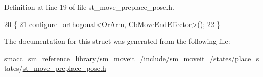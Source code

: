 Definition at line 19 of file st\+\_\+move\+\_\+preplace\+\_\+pose.\+h.


\begin{DoxyCode}
20             \{
21                 configure\_orthogonal<OrArm, CbMoveEndEffector>();
22             \}
\end{DoxyCode}


The documentation for this struct was generated from the following file\+:\begin{DoxyCompactItemize}
\item 
smacc\+\_\+sm\+\_\+reference\+\_\+library/sm\+\_\+moveit\+\_/include/sm\+\_\+moveit\+\_/states/place\+\_\+states/\hyperlink{4_2include_2sm__moveit__4_2states_2place__states_2st__move__preplace__pose_8h}{st\+\_\+move\+\_\+preplace\+\_\+pose.\+h}\end{DoxyCompactItemize}
